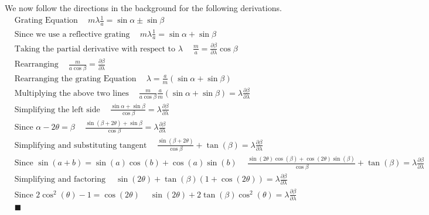 \documentclass[11pt]{article}
\begin{document}
    We now follow the directions in the background for the following
derivations. \begin{align}
&\text{Grating Equation}\quad\ m\lambda\frac{1}{a} = \sin\alpha\pm\sin\beta\\
&\text{Since we use a reflective grating}\quad\ m\lambda\frac{1}{a} = \sin\alpha+\sin\beta\\ 
&\text{Taking the partial derivative with respect to }\lambda\quad\  
\frac{m}{a} = \frac{\partial \beta}{\partial \lambda}\cos\beta\\ 
&\text{Rearranging}\quad\  \frac{m}{a\cos\beta} = \frac{\partial \beta}{\partial \lambda}\\
&\text{Rearranging the grating Equation}\quad\ \lambda = \frac{a}{m}(\sin\alpha+\sin\beta)\\
&\text{Multiplying the above two lines}\quad\  \frac{m}{a\cos\beta}\frac{a}{m}(\sin\alpha+\sin\beta) = \lambda\frac{\partial \beta}{\partial \lambda}\\
&\text{Simplifying the left side}\quad\  \frac{\sin\alpha+\sin\beta}{\cos\beta } = \lambda\frac{\partial \beta}{\partial \lambda}\\
&\text{Since }\alpha -2\theta=\beta \quad\ \frac{\sin(\beta+2\theta)+\sin\beta}{\cos\beta } = \lambda\frac{\partial \beta}{\partial \lambda}\\
&\text{Simplifying and substituting tangent}\quad\ \frac{\sin(\beta+2\theta)}{\cos\beta } + \tan( \beta) = \lambda\frac{\partial \beta}{\partial \lambda}\\
&\text{Since }\sin(a+b)= \sin(a)\cos(b)+\cos(a)\sin(b)\quad\ \frac{\sin(2\theta)\cos(\beta)+\cos(2\theta)\sin(\beta)}{\cos\beta } + \tan( \beta) = \lambda\frac{\partial \beta}{\partial \lambda}\\
&\text{Simplifying and factoring}\quad\  
\sin(2\theta) + \tan( \beta)(1+\cos(2\theta)) = \lambda\frac{\partial \beta}{\partial \lambda}\\ 
&\text{Since }2\cos^2(\theta)-1=\cos(2\theta)\quad\ 
\sin(2\theta) + 2\tan(\beta)\cos^2(\theta) = \lambda\frac{\partial \beta}{\partial \lambda}\\ 
&\blacksquare\nonumber
\end{align}
\end{document}

